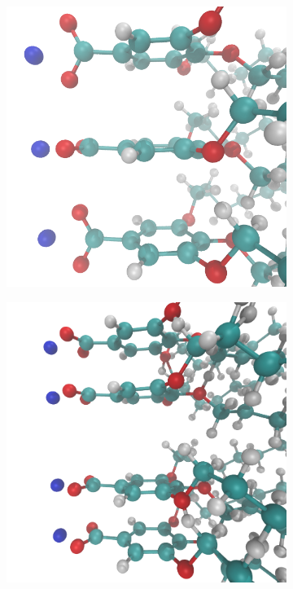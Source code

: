 \documentclass[journal=jpcbfk,manusciprt=article]{achemso}
\begin{document}
  \begin{figure}[htb]
  \centering
  \begin{subfigure}{0.3\linewidth}
  	\centering
  	\includegraphics[width=\textwidth]{rotated_carboxylate.png}
	\label{fig:rotated_carboxylate}
  \end{subfigure}
  \begin{subfigure}{0.3\linewidth}
  	\centering
  	\includegraphics[width=\textwidth]{staggered.png}

\end{subfigure}
\end{figure}
\end{document}
